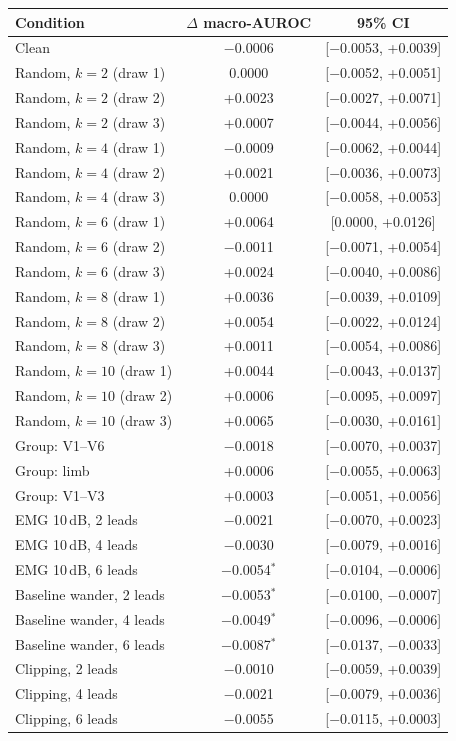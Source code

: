 \begin{tabular}{@{}lcc@{}}
\toprule
Condition & $\Delta$ macro-AUROC & 95\% CI \\
\midrule
Clean & $-$0.0006 & [$-$0.0053, +0.0039] \\
Random, $k=2$ (draw 1) & 0.0000 & [$-$0.0052, +0.0051] \\
Random, $k=2$ (draw 2) & +0.0023 & [$-$0.0027, +0.0071] \\
Random, $k=2$ (draw 3) & +0.0007 & [$-$0.0044, +0.0056] \\
Random, $k=4$ (draw 1) & $-$0.0009 & [$-$0.0062, +0.0044] \\
Random, $k=4$ (draw 2) & +0.0021 & [$-$0.0036, +0.0073] \\
Random, $k=4$ (draw 3) & 0.0000 & [$-$0.0058, +0.0053] \\
Random, $k=6$ (draw 1) & +0.0064 & [0.0000, +0.0126] \\
Random, $k=6$ (draw 2) & $-$0.0011 & [$-$0.0071, +0.0054] \\
Random, $k=6$ (draw 3) & +0.0024 & [$-$0.0040, +0.0086] \\
Random, $k=8$ (draw 1) & +0.0036 & [$-$0.0039, +0.0109] \\
Random, $k=8$ (draw 2) & +0.0054 & [$-$0.0022, +0.0124] \\
Random, $k=8$ (draw 3) & +0.0011 & [$-$0.0054, +0.0086] \\
Random, $k=10$ (draw 1) & +0.0044 & [$-$0.0043, +0.0137] \\
Random, $k=10$ (draw 2) & +0.0006 & [$-$0.0095, +0.0097] \\
Random, $k=10$ (draw 3) & +0.0065 & [$-$0.0030, +0.0161] \\
Group: V1--V6 & $-$0.0018 & [$-$0.0070, +0.0037] \\
Group: limb & +0.0006 & [$-$0.0055, +0.0063] \\
Group: V1--V3 & +0.0003 & [$-$0.0051, +0.0056] \\
EMG 10\,dB, 2 leads & $-$0.0021 & [$-$0.0070, +0.0023] \\
EMG 10\,dB, 4 leads & $-$0.0030 & [$-$0.0079, +0.0016] \\
EMG 10\,dB, 6 leads & $-$0.0054$^{*}$ & [$-$0.0104, $-$0.0006] \\
Baseline wander, 2 leads & $-$0.0053$^{*}$ & [$-$0.0100, $-$0.0007] \\
Baseline wander, 4 leads & $-$0.0049$^{*}$ & [$-$0.0096, $-$0.0006] \\
Baseline wander, 6 leads & $-$0.0087$^{*}$ & [$-$0.0137, $-$0.0033] \\
Clipping, 2 leads & $-$0.0010 & [$-$0.0059, +0.0039] \\
Clipping, 4 leads & $-$0.0021 & [$-$0.0079, +0.0036] \\
Clipping, 6 leads & $-$0.0055 & [$-$0.0115, +0.0003] \\
\bottomrule
\end{tabular}
